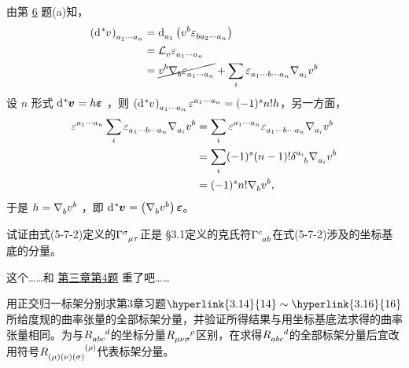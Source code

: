 \begin{xiti}
    \begin{zm}
    	由第 \hyperlink{5.6.a}{6} 题(a)知，
    	\begin{align*}
    	\tensor{\left(\dd{\tensor[^*]{v}{}}\right)}{_{a_1 \cdots a_n}} &= \dd\indices{_{a_1}} \left( \tensor{v}{^b} \tensor{\varepsilon}{_{b a_2 \cdots a_n}} \right)\\
    	&= \Ld{v} \tensor{\varepsilon}{_{a_1 \cdots a_n}}\\
    	&= \cancel{\tensor{v}{^b} \Nabla{b} \tensor{\varepsilon}{_{a_1 \cdots a_n}}} + \sum_{i} \tensor{\varepsilon}{_{a_1 \cdots b \cdots a_n}} \Nabla{a_i} \tensor{v}{^b}
    	\end{align*}
    	设 $n$ 形式 $\dd{\tensor[^*]{\bm{v}}{}}=h\bm{\varepsilon}$ ，则 $\tensor{\left(\dd{\tensor[^*]{v}{}}\right)}{_{a_1 \cdots a_n}} \tensor{\varepsilon}{^{a_1 \cdots a_n}} = (-1)^s n! h$，另一方面，
    	\begin{align*}
    	\tensor{\varepsilon}{^{a_1 \cdots a_n}} \sum_{i} \tensor{\varepsilon}{_{a_1 \cdots b \cdots a_n}} \Nabla{a_i} \tensor{v}{^b} &= \sum_{i} \tensor{\varepsilon}{^{a_1 \cdots a_n}} \tensor{\varepsilon}{_{a_1 \cdots b \cdots a_n}} \Nabla{a_i} \tensor{v}{^b}\\
    	&= \sum_{i} (-1)^s (n-1)! \tensor{\delta}{^{a_i}_b} \Nabla{a_i} \tensor{v}{^b}\\
    	&= (-1)^s n! \Nabla{b} \tensor{v}{^b},
    	\end{align*}
    	于是 $h=\Nabla{b} \tensor{v}{^b}$ ，即 $\dd{\tensor[^*]{\bm{v}}{}} = \left(\Nabla{b} \tensor{v}{^b}\right) \bm{\varepsilon}$。
    \end{zm}

    \item 试证由式(5-7-2)定义的$\ChristoffelSymbol{\sigma}{\mu}{\tau} $正是 \S 3.1定义的克氏符$\ChristoffelSymbol{c}{a}{b} $在式(5-7-2)涉及的坐标基底的分量。

    \begin{zm}
    	这个……和 \hyperlink{3.4}{第三章第4题} 重了吧……
    \end{zm}

    \item 用正交归一标架分别求第3章习题$\hyperlink{3.14}{14} \sim \hyperlink{3.16}{16}$所给度规的曲率张量的全部标架分量，并验证所得结果与用坐标基底法求得的曲率张量相同。为与$\tensor{R}{_a_b_c^d} $的坐标分量$\tensor{R}{_\mu_\nu_\sigma^\rho} $区别，在求得$\tensor{R}{_a_b_c^d}$的全部标架分量后宜改用符号$\tensor{R}{_{(\mu)}_{(\nu)}_{(\sigma)}^{(\rho)}} $代表标架分量。


\end{xiti}
